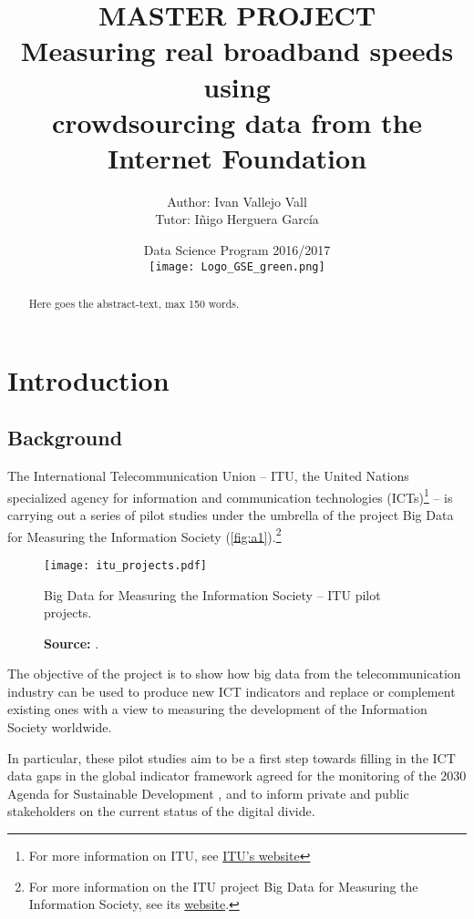 \documentclass[12pt]{article}
\author{Author: Ivan Vallejo Vall \\ Tutor: Iñigo Herguera García}
\title{%
  \vspace{-0.0cm}MASTER PROJECT \\ 
  \vspace{1cm} Measuring real broadband speeds using \\ crowdsourcing data from the Internet Foundation \\ \vspace{2cm} 
  }
\date{\vspace{1cm} Data Science Program 2016/2017 \\ 
\vspace{2cm} \texttt{[image: Logo\_GSE\_green.png]}}
\begin{document}
\linespread{1.4}\selectfont
{}%
\maketitle
\newpage
\begin{abstract}
   Here goes the abstract-text, max 150 words.
\end{abstract}
\newpage
\tableofcontents
\newpage
\listoffigures
\newpage
{}%
\section{Introduction}
\subsection{Background}
The International Telecommunication Union -- ITU, the United Nations specialized agency for information and communication technologies (ICTs)\footnote{For more information on ITU, see \href{http://www.itu.int/en/about/Pages/default.aspx}{ITU's website}} -- is carrying out a series of pilot studies under the umbrella of the project Big Data for Measuring the Information Society (\autoref{fig:a1}).\footnote{For more information on the ITU project Big Data for Measuring the Information Society, see its \href{http://www.itu.int/en/ITU-D/Statistics/Pages/bigdata/default.aspx}{website}.} 
\vspace{1cm}
\begin{figure}[H]
    \centering
        \texttt{[image: itu\_projects.pdf]}
        \caption{Big Data for Measuring the Information Society -- ITU pilot projects.}
        \caption*{\textbf{Source:} \cite{margus}.}
        \label{fig:a1}
\end{figure}   


The objective of the project is to show how big data from the telecommunication industry can be used to produce new ICT indicators and replace or complement existing ones with a view to measuring the development of the Information Society worldwide. 

In particular, these pilot studies aim to be a first step towards filling in the ICT data gaps in the global indicator framework agreed for the monitoring of the 2030 Agenda for Sustainable Development \citep{interagency}, and to inform private and public stakeholders on the current status of the digital divide.      
\end{document}
